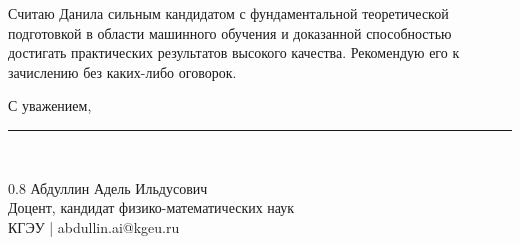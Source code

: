 \documentclass[a4paper,12pt]{article}
\begin{document}
Считаю Данила сильным кандидатом с фундаментальной теоретической подготовкой в области машинного обучения и доказанной способностью достигать практических результатов высокого качества. Рекомендую его к зачислению без каких-либо оговорок.

\vspace{10pt}
\noindent С уважением,

\vspace{15pt}
\rule{5cm}{0.4pt}\\[4pt]
\begin{spacing}{0.8}
  {Абдуллин Адель Ильдусович}\\
  {\small Доцент, кандидат физико-математических наук}\\
  {\small КГЭУ | abdullin.ai@kgeu.ru}
\end{spacing}
\end{document}
